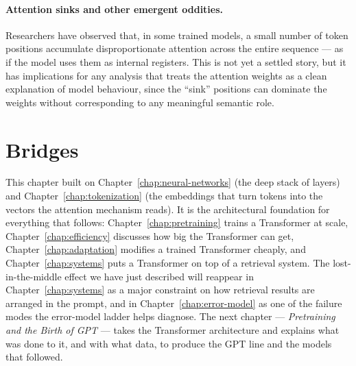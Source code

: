 \paragraph{Attention sinks and other emergent oddities.}
Researchers have observed that, in some trained models, a small
number of token positions accumulate disproportionate attention
across the entire sequence --- as if the model uses them as
internal registers. This is not yet a settled story, but it has
implications for any analysis that treats the attention
weights as a clean explanation of model behaviour, since the
``sink'' positions can dominate the weights without
corresponding to any meaningful semantic role.

\section*{Bridges}

This chapter built on Chapter~\ref{chap:neural-networks} (the deep stack of layers) and
Chapter~\ref{chap:tokenization} (the embeddings that turn tokens into the vectors the
attention mechanism reads). It is the architectural foundation
for everything that follows: Chapter~\ref{chap:pretraining} trains a Transformer at
scale, Chapter~\ref{chap:efficiency} discusses how big the Transformer can get,
Chapter~\ref{chap:adaptation} modifies a trained Transformer cheaply, and
Chapter~\ref{chap:systems} puts a Transformer on top of a retrieval system.
The lost-in-the-middle effect we have just described will
reappear in Chapter~\ref{chap:systems} as a major constraint on how retrieval
results are arranged in the prompt, and in Chapter~\ref{chap:error-model} as one of
the failure modes the error-model ladder helps diagnose. The
next chapter --- \emph{Pretraining and the Birth of GPT} ---
takes the Transformer architecture and explains what was done
to it, and with what data, to produce the GPT line and the
models that followed.
